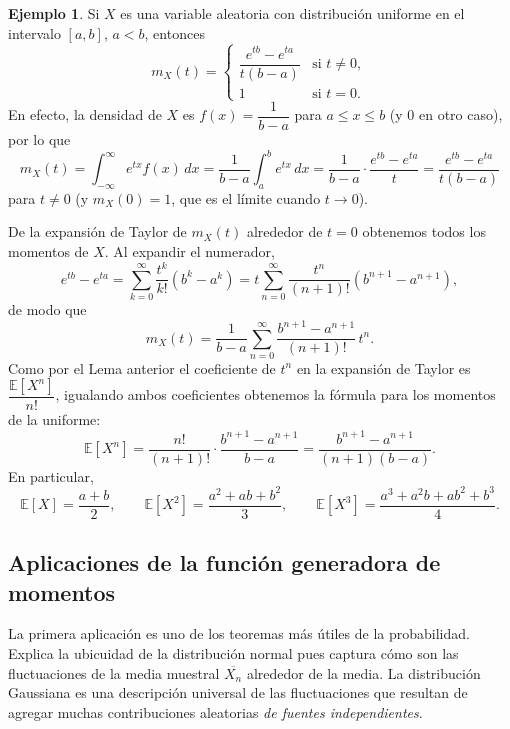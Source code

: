\documentclass[12pt]{amsart}
\theoremstyle{definition}
\newtheorem{examplex}[lemma]{Ejemplo}
\newcommand{\EE}{\ensuremath{\mathbb{E}}}
\begin{document}
\begin{examplex} 
    Si $X$ es una variable aleatoria con distribución uniforme en el intervalo $[a,b]$, $a<b$, entonces
\[
m_X(t)=\begin{cases}
\dfrac{e^{tb}-e^{ta}}{t(b-a)} & \text{si }t\neq 0,\\[6pt]
1 & \text{si }t=0.
\end{cases}
\]
En efecto, la densidad de $X$ es $f(x)=\dfrac{1}{b-a}$ para $a\le x\le b$ (y $0$ en otro caso), por lo que
\[
m_X(t)=\int_{-\infty}^{\infty}e^{tx}f(x)\,dx
   =\frac{1}{b-a}\int_{a}^{b}e^{tx}\,dx
   =\frac{1}{b-a}\cdot\frac{e^{tb}-e^{ta}}{t}
   =\frac{e^{tb}-e^{ta}}{t(b-a)}
\]
para $t\neq 0$ (y $m_X(0)=1$, que es el límite cuando $t\to 0$).

De la expansión de Taylor de $m_X(t)$ alrededor de $t=0$ obtenemos todos los momentos de $X$. Al expandir el numerador,
\[
e^{tb}-e^{ta}=\sum_{k=0}^{\infty}\frac{t^k}{k!}\left(b^k-a^k\right)
   =t\sum_{n=0}^{\infty}\frac{t^n}{(n+1)!}\left(b^{n+1}-a^{n+1}\right),
\]
de modo que
\[
m_X(t)=\frac{1}{b-a}\sum_{n=0}^{\infty}\frac{b^{n+1}-a^{n+1}}{(n+1)!}\,t^n.
\]
Como por el Lema anterior el coeficiente de $t^n$ en la expansión de Taylor es $\dfrac{\EE[X^n]}{n!}$, igualando ambos coeficientes obtenemos la fórmula para los momentos de la uniforme:
\[
\EE[X^n]=\frac{n!}{(n+1)!}\cdot\frac{b^{n+1}-a^{n+1}}{b-a}
   =\frac{b^{n+1}-a^{n+1}}{(n+1)(b-a)}.
\]
En particular,
\[
\EE[X]=\frac{a+b}{2},\qquad
\EE[X^2]=\frac{a^2+ab+b^2}{3},\qquad
\EE[X^3]=\frac{a^3+a^2b+ab^2+b^3}{4}.
\]
\end{examplex}

\subsection{Aplicaciones de la función generadora de momentos}

La primera aplicación es uno de los teoremas más útiles de la probabilidad. Explica la ubicuidad de la distribución normal pues captura cómo son las fluctuaciones de la media muestral $\overline{X_n}$ alrededor de la media. La distribución Gaussiana es una descripción universal de las fluctuaciones que resultan de agregar muchas contribuciones aleatorias \emph{de fuentes independientes}.
\end{document}
